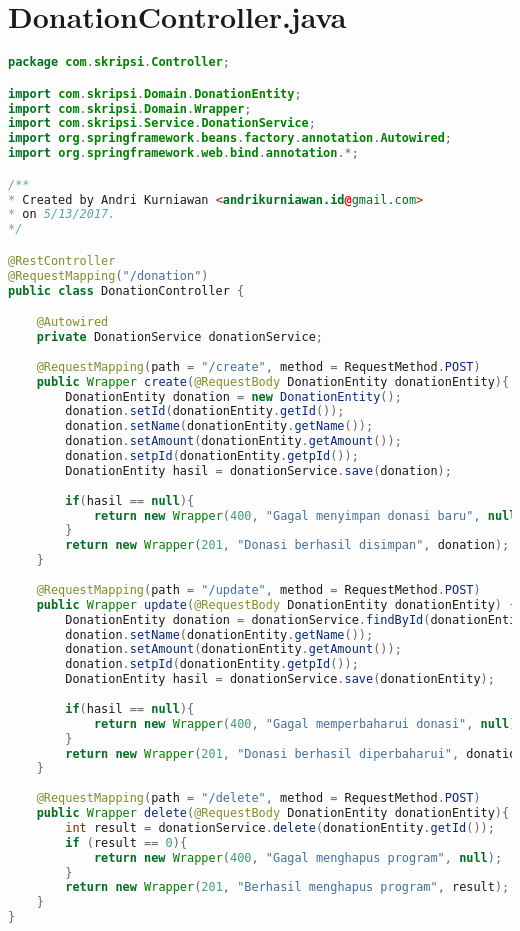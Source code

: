 \section*{DonationController.java}
\begin{lstlisting}[caption={Berkas DonationController.java},label={lst:DonationController},language=Java]
package com.skripsi.Controller;

import com.skripsi.Domain.DonationEntity;
import com.skripsi.Domain.Wrapper;
import com.skripsi.Service.DonationService;
import org.springframework.beans.factory.annotation.Autowired;
import org.springframework.web.bind.annotation.*;

/**
* Created by Andri Kurniawan <andrikurniawan.id@gmail.com>
* on 5/13/2017.
*/

@RestController
@RequestMapping("/donation")
public class DonationController {

	@Autowired
	private DonationService donationService;
	
	@RequestMapping(path = "/create", method = RequestMethod.POST)
	public Wrapper create(@RequestBody DonationEntity donationEntity){
		DonationEntity donation = new DonationEntity();
		donation.setId(donationEntity.getId());
		donation.setName(donationEntity.getName());
		donation.setAmount(donationEntity.getAmount());
		donation.setpId(donationEntity.getpId());
		DonationEntity hasil = donationService.save(donation);
		
		if(hasil == null){
			return new Wrapper(400, "Gagal menyimpan donasi baru", null);
		}
		return new Wrapper(201, "Donasi berhasil disimpan", donation);
	}
	
	@RequestMapping(path = "/update", method = RequestMethod.POST)
	public Wrapper update(@RequestBody DonationEntity donationEntity) {
		DonationEntity donation = donationService.findById(donationEntity.getId());
		donation.setName(donationEntity.getName());
		donation.setAmount(donationEntity.getAmount());
		donation.setpId(donationEntity.getpId());
		DonationEntity hasil = donationService.save(donationEntity);
		
		if(hasil == null){
			return new Wrapper(400, "Gagal memperbaharui donasi", null);
		}
		return new Wrapper(201, "Donasi berhasil diperbaharui", donation);
	}
	
	@RequestMapping(path = "/delete", method = RequestMethod.POST)
	public Wrapper delete(@RequestBody DonationEntity donationEntity){
		int result = donationService.delete(donationEntity.getId());
		if (result == 0){
			return new Wrapper(400, "Gagal menghapus program", null);
		}
		return new Wrapper(201, "Berhasil menghapus program", result);
	}
}


\end{lstlisting}

